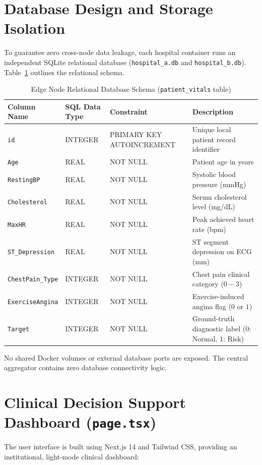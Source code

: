 \documentclass[12pt,a4paper,oneside]{report}
\begin{document}
\section{Database Design and Storage Isolation}
To guarantee zero cross-node data leakage, each hospital container runs an independent SQLite relational database (\texttt{hospital\_a.db} and \texttt{hospital\_b.db}). Table~\ref{tab:db_schema} outlines the relational schema.

\begin{table}[H]
\centering
\caption{Edge Node Relational Database Schema (\texttt{patient\_vitals} table)}
\label{tab:db_schema}
\begin{tabularx}{\textwidth}{l l l X}
\toprule
\textbf{Column Name} & \textbf{SQL Data Type} & \textbf{Constraint} & \textbf{Description} \\
\midrule
\texttt{id} & INTEGER & PRIMARY KEY AUTOINCREMENT & Unique local patient record identifier \\
\texttt{Age} & REAL & NOT NULL & Patient age in years \\
\texttt{RestingBP} & REAL & NOT NULL & Systolic blood pressure (mmHg) \\
\texttt{Cholesterol} & REAL & NOT NULL & Serum cholesterol level (mg/dL) \\
\texttt{MaxHR} & REAL & NOT NULL & Peak achieved heart rate (bpm) \\
\texttt{ST\_Depression} & REAL & NOT NULL & ST segment depression on ECG (mm) \\
\texttt{ChestPain\_Type} & INTEGER & NOT NULL & Chest pain clinical category ($0 - 3$) \\
\texttt{ExerciseAngina} & INTEGER & NOT NULL & Exercise-induced angina flag ($0$ or $1$) \\
\texttt{Target} & INTEGER & NOT NULL & Ground-truth diagnostic label ($0$: Normal, $1$: Risk) \\
\bottomrule
\end{tabularx}
\end{table}

No shared Docker volumes or external database ports are exposed. The central aggregator contains zero database connectivity logic.

\section{Clinical Decision Support Dashboard (\texttt{page.tsx})}
The user interface is built using Next.js 14 and Tailwind CSS, providing an institutional, light-mode clinical dashboard:
\end{document}
